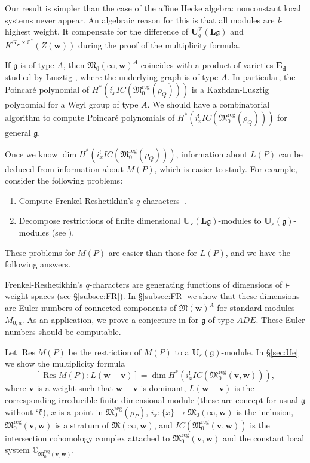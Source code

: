 \documentclass[12pt]{amsart}
\def\Bbb{\mathbb}
\def\frak{\mathfrak}
\theoremstyle{definition}
\theoremstyle{remark}
\numberwithin{equation}{subsection}
\newcommand{\secref}[1]{\S\ref{#1}}
\newcommand{\subsecref}[1]{\S\ref{#1}}
\newcommand{\C}{{\Bbb C}}
\newcommand{\Z}{{\Bbb Z}}
\newcommand{\M}{{\frak M}} %
\newcommand{\Mreg}{{\frak M_0^{\operatorname{reg}}}}
\newcommand{\bv}{{\mathbf v}} %
\newcommand{\bw}{{\mathbf w}} %
\newcommand{\Ue}{{\mathbf U}_{\varepsilon}(\mathfrak g)}
\newcommand{\Uli}{{\mathbf U}^{\Z}_q({\mathbf L}\mathfrak g)}
\newcommand{\Ule}{{\mathbf U}_{\varepsilon}({\mathbf L}\mathfrak g)}
\newcommand{\Zw}{Z(\bw)}
\newcommand{\Mw}{\M(\bw)}
\begin{document}
Our result is simpler than the case of the affine Hecke algebra:
nonconstant local systems never appear. An algebraic reason for this
is that all modules are {\it l\/}-highest weight. It compensate for
the difference of $\Uli$ and $K^{G_\bw\times\C^*}(\Zw)$ during the
proof of the multiplicity formula.

If $\mathfrak g$ is of type $A$, then $\M_0(\infty,\bw)^A$ coincides
with a product of varieties ${\mathbf E_{\mathbf d}}$ studied by
Lusztig \cite{Lu}, where the underlying graph is of type $A$. In
particular, the Poincar\'e polynomial of 
\(
   H^*(i_x^! IC(\Mreg(\rho_Q)))
\)
is a Kazhdan-Lusztig polynomial for a Weyl group of type $A$.
%
We should have a combinatorial algorithm to compute Poincar\'e
polynomials of $H^*(i_x^! IC(\Mreg(\rho_Q)))$ for general $\mathfrak
g$.

Once we know $\dim H^*(i_x^! IC(\Mreg(\rho_Q)))$, information about
$L(P)$ can be deduced from information about $M(P)$, which is easier
to study.
%
For example, consider the following problems:
\begin{enumerate}
\item Compute Frenkel-Reshetikhin's $q$-characters~\cite{FR}.
\item Decompose restrictions of finite dimensional $\Ule$-modules
to $\Ue$-modules (see \cite{Kl}).
\end{enumerate}

These problems for $M(P)$ are easier than those for $L(P)$, and we
have the following answers.

Frenkel-Reshetikhin's $q$-characters are generating functions of
dimensions of {\it l\/}-weight spaces (see \subsecref{subsec:FR}).
In \subsecref{subsec:FR} we show that these dimensions are Euler
numbers of connected components of $\Mw^A$ for standard modules
$M_{0,a}$.
%
As an application, we prove a conjecture in \cite{FR} for $\mathfrak
g$ of type $ADE$.
%
These Euler numbers should be computable.

Let $\operatorname{Res}M(P)$ be the restriction of $M(P)$ to a
$\Ue$-module. In \secref{sec:Ue} we show the multiplicity formula
\[
   \left[ \operatorname{Res}M(P) : L(\bw-\bv) \right]
   = \dim H^*(i_x^! IC(\Mreg(\bv,\bw))),
\]
where $\bv$ is a weight such that $\bw - \bv$ is dominant,
$L(\bw-\bv)$ is the corresponding irreducible finite dimensional module
(these are concept for usual $\mathfrak g$ without `{\it l\/}'),
$x$ is a point in $\Mreg(\rho_P)$,
$i_x\colon \{x\}\to \M_0(\infty,\bw)$ is the inclusion,
$\Mreg(\bv,\bw)$ is a stratum of $\M(\infty,\bw)$,
and $IC(\Mreg(\bv,\bw))$ is the intersection cohomology complex
attached to $\Mreg(\bv,\bw)$ and the constant local system
$\C_{\Mreg(\bv,\bw)}$.
\end{document}
